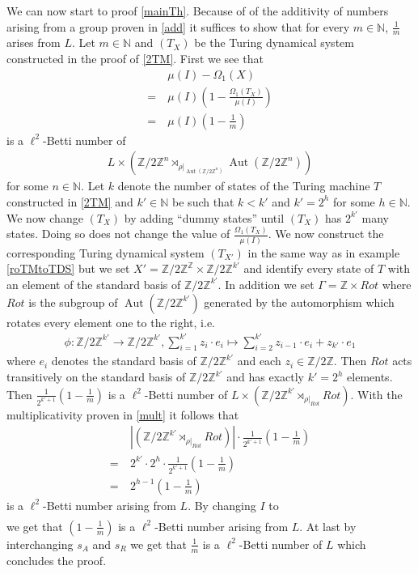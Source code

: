 \documentclass[12pt,a4paper]{scrartcl}
\theoremstyle{plain}
\theoremstyle{definition}
\numberwithin{equation}{section}
\newcommand{\Z}{\mathbb{Z}} %
\newcommand{\N}{\mathbb{N}} %
\newcommand{\2}{\mathbb{Z} / 2 \mathbb{Z}}
\newcommand{\1}{\bar{1}}
\newcommand{\0}{\bar{0}}
\newcommand{\Aut}{\operatorname{Aut}}
\begin{document}
We can now start to proof \ref{mainTh}. Because of of the additivity of numbers arising from a group proven in \ref{add} it suffices to show that for every $m \in \N$, $\frac{1}{m}$ arises from $L$. Let $m \in \N$  and $(T_X)$ be the Turing dynamical system constructed in the proof of \ref{2TM}. First we see that
\begin{align*}
	 &~ \mu (I) - \Omega_1(X) \\
	=&~ \mu (I) (1 - \frac{\Omega_1(T_X)}{\mu(I)}) \\
	=&~ \mu (I) (1 - \frac{1}{m})
\end{align*}
is a $\ell^2$-Betti number of 
\begin{align*}
	L \times (\2^n \rtimes_{\rho|_{\Aut(\2^n)}} \Aut(\2^n))
\end{align*}
for some $n \in \N$. Let $k$ denote the number of states of the Turing machine $T$ constructed in \ref{2TM} and $k' \in \N$ be such that $k < k'$ and $k' = 2^{h}$ for some $h \in \N$. We now change $(T_X)$ by adding ``dummy states'' until $(T_X)$ has $2^{k'}$ many states. Doing so does not change the value of $\frac{\Omega_1(T_X)}{\mu(I)}$. We now construct the corresponding Turing dynamical system $(T_{X'})$ in the same way as in example \ref{roTMtoTDS} but we set $X' = \2^\Z \times \2^{k'}$ and identify every state of $T$ with an element of the standard basis of $\2^{k'}$. In addition we set $\Gamma = \Z \times Rot$ where $Rot$ is the subgroup of $\Aut(\2^{k'})$ generated by the automorphism which rotates every element one to the right, i.e.
\begin{align*}
	\phi \colon\2^{k'} \to \2^{k'}, \sum_{i =1}^{k'}z_i \cdot e_i \mapsto \sum_{i =2}^{k'}z_{i - 1} \cdot e_i + z_{k'} \cdot e_1
\end{align*}
where $e_i$ denotes the standard basis of $\2^{k'}$ and each $z_i \in \2$. Then $Rot$ acts transitively on the standard basis of $\2^{k'}$ and has exactly $k' = 2^{h}$ elements. Then $\frac{1}{2^{k' + 1}} (1 - \frac{1}{m})$ is a $\ell^2$-Betti number of $L \times (\2^{k'} \rtimes_{\rho|_{Rot}} Rot)$. With the multiplicativity proven in \ref{mult} it follows that 
\begin{align*}
	 &~ |(\2^{k'} \rtimes_{\rho|_{Rot}} Rot)| \cdot \frac{1}{2^{k' + 1}} (1 - \frac{1}{m}) \\
	=&~ 2^{k'} \cdot 2^h \cdot \frac{1}{2^{k' + 1}} (1 - \frac{1}{m}) \\
	=&~ 2^{h -1} (1 - \frac{1}{m})
\end{align*}
is a $\ell^2$-Betti number arising from $L$. By changing $I$ to
\begin{align*}
	[\1^{h-1} \underline{\1}][s_I]
\end{align*}
we get that $(1 - \frac{1}{m})$ is a $\ell^2$-Betti number arising from $L$. At last by interchanging $s_A$ and $s_R$ we get that $\frac{1}{m}$ is a $\ell^2$-Betti number of $L$ which concludes the proof.
\end{document}
